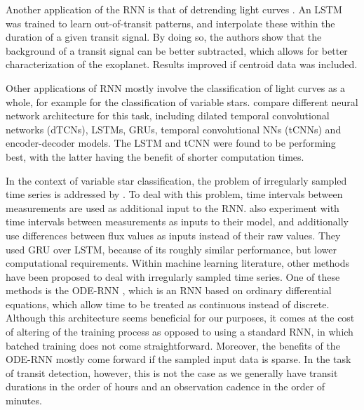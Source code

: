 Another application of the RNN is that of detrending light curves \citep{morvan2020detrending}. An LSTM was trained to learn out-of-transit patterns, and interpolate these within the duration of a given transit signal. By doing so, the authors show that the background of a transit signal can be better subtracted, which allows for better characterization of the exoplanet. Results improved if centroid data was included.

Other applications of RNN mostly involve the classification of light curves as a whole, for example for the classification of variable stars. \cite{jamal2020neural} compare different neural network architecture for this task, including dilated temporal convolutional networks (dTCNs), LSTMs, GRUs, temporal convolutional NNs (tCNNs) and encoder-decoder models. The LSTM and tCNN were found to be performing best, with the latter having the benefit of shorter computation times. 

In the context of variable star classification, the problem of irregularly sampled time series is addressed by \cite{naul2018recurrent}. To deal with this problem, time intervals between measurements are used as additional input to the RNN. \cite{becker2020scalable} also experiment with time intervals between measurements as inputs to their model, and additionally use differences between flux values as inputs instead of their raw values. They used GRU over LSTM, because of its roughly similar performance, but lower computational requirements. Within machine learning literature, other methods have been proposed to deal with irregularly sampled time series. One of these methods is the ODE-RNN \citep{rubanova2019latent, chen2018neural}, which is an RNN based on ordinary differential equations, which allow time to be treated as continuous instead of discrete. Although this architecture seems beneficial for our purposes, it comes at the cost of altering of the training process as opposed to using a standard RNN, in which batched training does not come straightforward. Moreover, the benefits of the ODE-RNN mostly come forward if the sampled input data is sparse. In the task of transit detection, however, this is not the case as we generally have transit durations in the order of hours and an observation cadence in the order of minutes.

